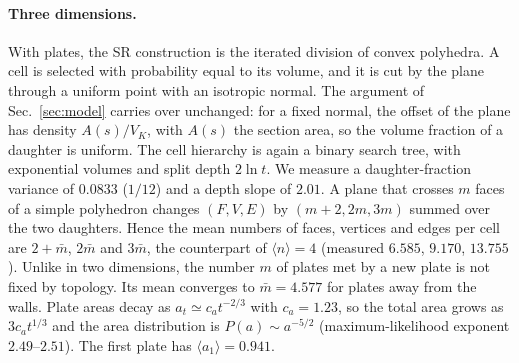 
\paragraph*{Three dimensions.}
With plates, the SR construction is the iterated division of convex polyhedra. A cell
is selected with probability equal to its volume, and it is cut by the plane through a
uniform point with an isotropic normal. The argument of Sec.~\ref{sec:model} carries over
unchanged: for a fixed normal, the offset of the plane has density $A(s)/V_K$, with $A(s)$
the section area, so the volume fraction of a daughter is uniform. The cell hierarchy is
again a binary search tree, with exponential volumes and split depth $2\ln t$. We measure
a daughter-fraction variance of $0.0833$ ($1/12$) and a depth slope of $2.01$. A plane that
crosses $m$ faces of a simple polyhedron changes $(F,V,E)$ by $(m+2,2m,3m)$ summed over the
two daughters. Hence the mean numbers of faces, vertices and edges per cell are
$2+\bar m$, $2\bar m$ and $3\bar m$, the counterpart of $\langle n\rangle=4$ (measured
$6.585$, $9.170$, $13.755$). Unlike in two dimensions, the number $m$ of plates met by a new
plate is not fixed by topology. Its mean converges to $\bar m=4.577$ for plates away from
the walls. Plate areas decay as $a_t\simeq c_at^{-2/3}$ with $c_a=1.23$, so the total area
grows as $3c_at^{1/3}$ and the area distribution is $P(a)\sim a^{-5/2}$ (maximum-likelihood
exponent $2.49$--$2.51$). The first plate has $\langle a_1\rangle=0.941$.

